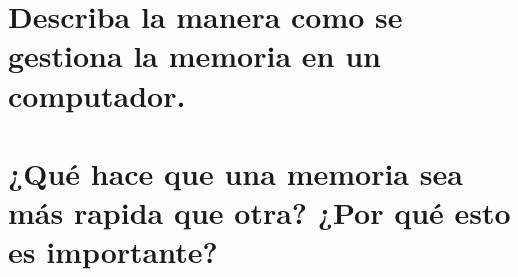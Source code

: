 \documentclass{article}
\begin{document}
\section{Describa la manera como se gestiona la memoria en un computador.} \label{contenido}
        \Large

\section{¿Qué hace que una memoria sea más rapida que otra? ¿Por qué esto es importante?} \label{contenido}
        \Large
\end{document}
